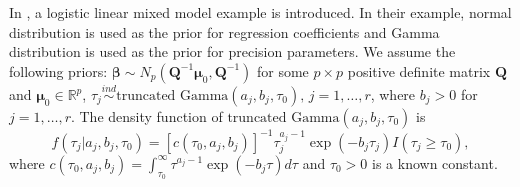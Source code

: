 \documentclass[11pt,a4paper]{article}
\begin{document}
In \cite{polson2013bayesian}, a logistic linear mixed model example is introduced. In their example, normal distribution is used as the prior for regression coefficients and Gamma distribution is used as the prior for precision parameters. We assume the following priors: $\bm{\beta} \sim  N_p(\bm{Q}^{-1}\bm{\mu}_0, \bm{Q}^{-1})$ for some $p\times p$ positive definite matrix $\bm{Q}$ and $\bm{\mu}_0 \in \mathbb{R}^p$,
$\tau_j \overset{ind} \sim \text{truncated Gamma}(a_j,b_j,\tau_0), \,j=1,\dots,r$, where $b_j >0$ for $j=1,\dots, r$.  The density function of $\text{truncated Gamma}(a_j, b_j, \tau_0)$ is
\begin{equation}
\label{eq_tngamma0}
f\left(\tau_{j}|a_j,b_j,\tau_0\right)=[c\left(\tau_{0},a_{j},b_{j}\right)]^{-1}\tau_{j}^{a_{j}-1}\exp\left( - b_j \tau_j\right) I(\tau_j\geq\tau_0),
\end{equation}
where $c\left(\tau_{0},a_{j},b_{j}\right) = \int_{\tau_0}^{\infty}\tau^{a_{j}-1}\exp\left( - b_j \tau\right)  d\tau$ and $\tau_0 >0$ is a known constant.
\end{document}
